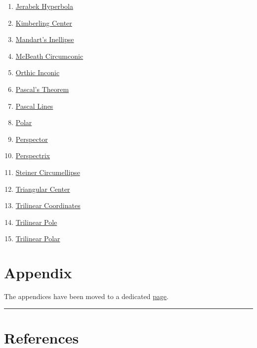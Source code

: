 \documentclass[]{article}
\begin{document}
\begin{enumerate}
\item
  \href{http://mathworld.wolfram.com/JerabekHyperbola.html}{Jerabek Hyperbola}
\item
  \href{http://mathworld.wolfram.com/KimberlingCenter.html}{Kimberling Center}
\item
  \href{http://mathworld.wolfram.com/MandartInellipse.html}{Mandart's Inellipse}
\item
  \href{http://mathworld.wolfram.com/MacBeathCircumconic.html}{McBeath Circumconic}
\item
  \href{http://mathworld.wolfram.com/OrthicInconic.html}{Orthic Inconic}
\item
  \href{http://mathworld.wolfram.com/PascalsTheorem.html}{Pascal's Theorem}
\item
  \href{http://mathworld.wolfram.com/PascalLines.html}{Pascal Lines}
\item
  \href{http://mathworld.wolfram.com/Polar.html}{Polar}
\item
  \href{http://mathworld.wolfram.com/Perspector.html}{Perspector}
\item
  \href{http://mathworld.wolfram.com/Perspectrix.html}{Perspectrix}
\item
  \href{http://mathworld.wolfram.com/ExtouchTriangle.html}{Steiner Circumellipse}
\item
  \href{http://mathworld.wolfram.com/TriangleCenter.html}{Triangular Center}
\item
  \href{http://mathworld.wolfram.com/TrilinearCoordinates.html}{Trilinear Coordinates}
\item
  \href{http://mathworld.wolfram.com/TrilinearPole.html}{Trilinear Pole}
\item
  \href{http://mathworld.wolfram.com/TrilinearPolar.html}{Trilinear Polar}
\end{enumerate}

\hypertarget{appendix}{%
\section{Appendix}\label{appendix}}

The appendices have been moved to a dedicated \href{appendices.html}{page}.

\begin{center}\rule{0.5\linewidth}{\linethickness}\end{center}

\hypertarget{references}{%
\section*{References}\label{references}}
\end{document}

